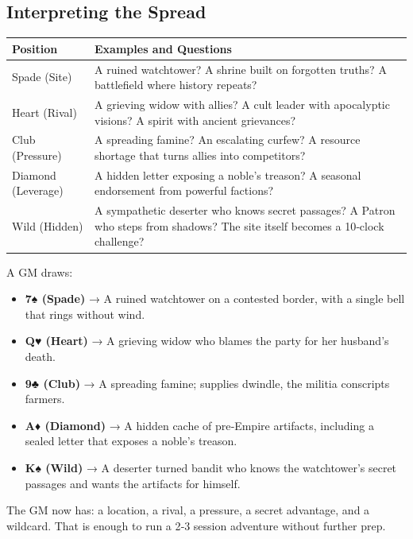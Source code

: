 \subsection{Interpreting the Spread}
\label{subsec:crown-interpreting}

\begin{fatebox}
\begin{tabularx}{\textwidth}{lX}
\toprule
\textbf{Position} & \textbf{Examples and Questions} \\
\midrule
Spade (Site) & A ruined watchtower? A shrine built on forgotten truths? A battlefield where history repeats? \\
Heart (Rival) & A grieving widow with allies? A cult leader with apocalyptic visions? A spirit with ancient grievances? \\
Club (Pressure) & A spreading famine? An escalating curfew? A resource shortage that turns allies into competitors? \\
Diamond (Leverage) & A hidden letter exposing a noble’s treason? A seasonal endorsement from powerful factions? \\
Wild (Hidden) & A sympathetic deserter who knows secret passages? A Patron who steps from shadows? The site itself becomes a 10‑clock challenge? \\
\bottomrule
\end{tabularx}
\end{fatebox}

\begin{tcolorbox}[colback=green!5!white, colframe=green!75!black, title=🌿 Worked Example: “The Bell at Blackwood Tower”]
  A GM draws:
  \begin{itemize}
    \item \textbf{7♠ (Spade)} → A ruined watchtower on a contested border, with a single bell that rings without wind.
    \item \textbf{Q♥ (Heart)} → A grieving widow who blames the party for her husband’s death.
    \item \textbf{9♣ (Club)} → A spreading famine; supplies dwindle, the militia conscripts farmers.
    \item \textbf{A♦ (Diamond)} → A hidden cache of pre‑Empire artifacts, including a sealed letter that exposes a noble’s treason.
    \item \textbf{K♠ (Wild)} → A deserter turned bandit who knows the watchtower’s secret passages and wants the artifacts for himself.
  \end{itemize}
  The GM now has: a location, a rival, a pressure, a secret advantage, and a wildcard. That is enough to run a 2‑3 session adventure without further prep.
\end{tcolorbox}

